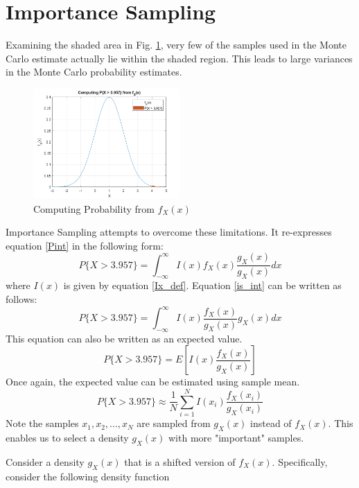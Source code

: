 \documentclass[conference]{IEEEtran}
\begin{document}
\section{Importance Sampling}
Examining the shaded area in Fig. 
\ref{Monte Carlo Limits}, very few of the samples used in the Monte Carlo estimate actually lie within the shaded region. This  leads to large variances in the Monte Carlo probability estimates.
\begin{figure}[H]
\centerline{\includegraphics[width=0.5\textwidth]{Monte_Carlo_Limitations.png}}
\caption{Computing Probability from $f_X(x)$}
\label{Monte Carlo Limits}
\end{figure}
Importance Sampling attempts to overcome these limitations. It re-expresses equation \eqref{Pint} in the following form:
\begin{equation}
P\{X > 3.957\} = \int_{-\infty}^{\infty}I(x)f_X(x)\frac{g_X(x)}{g_X(x)}dx
\label{is_int}
\end{equation}
where $I(x)$ is given by equation \eqref{Ix_def}.
Equation \eqref{is_int} can be written as follows:
\begin{equation}
P\{X > 3.957\} = \int_{-\infty}^{\infty}I(x)\frac{f_X(x)}{g_X(x)}g_X(x)dx
\end{equation}
This equation can also be written as an expected value.
\begin{equation}
P\{X > 3.957\} = E\left[I(x)\frac{f_X(x)}{g_X(x)}\right]
\end{equation}
Once again, the expected value can be estimated using sample mean.
\begin{equation}
P\{X > 3.957\} \approx \frac{1}{N}\sum_{i=1}^{N}I(x_i)\frac{f_X(x_i)}{g_X(x_i)}
\end{equation}
Note the samples $x_1,x_2,...,x_N$ are sampled from $g_X(x)$ instead of $f_X(x)$. This enables us to select a density $g_X(x)$ with more "important" samples. 
\par
Consider a density $g_X(x)$ that is a shifted version of $f_X(x)$. Specifically, consider the following density function
\end{document}
